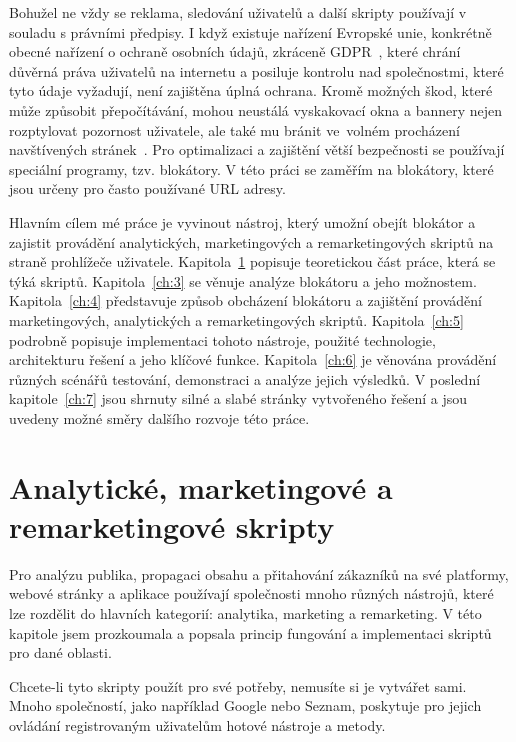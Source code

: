 Bohužel ne vždy se reklama, sledování uživatelů a další skripty používají v souladu s právními předpisy. I když existuje nařízení Evropské unie, konkrétně obecné nařízení o ochraně osobních údajů, zkráceně GDPR~\cite{GDPR}, které chrání důvěrná práva uživatelů na internetu a posiluje kontrolu nad společnostmi, které tyto údaje vyžadují, není zajištěna úplná ochrana. Kromě možných škod, které může způsobit přepočítávání, mohou neustálá vyskakovací okna a bannery nejen rozptylovat pozornost uživatele, ale také mu bránit ve~volném procházení navštívených stránek~\cite{adblock}. Pro optimalizaci a zajištění větší bezpečnosti se používají speciální programy, tzv. blokátory. V této práci se zaměřím na blokátory, které jsou určeny pro často používané URL adresy. 

Hlavním cílem mé práce je vyvinout nástroj, který umožní obejít blokátor a zajistit provádění analytických, marketingových a remarketingových skriptů na straně prohlížeče uživatele. Kapitola~\ref{ch:2} popisuje teoretickou část práce, která se týká skriptů. Kapitola~\ref{ch:3} se věnuje analýze blokátoru a jeho možnostem. Kapitola~\ref{ch:4} představuje způsob obcházení blokátoru a zajištění provádění marketingových, analytických a remarketingových skriptů. Kapitola~\ref{ch:5} podrobně popisuje implementaci tohoto nástroje, použité technologie, architekturu řešení a jeho klíčové funkce. Kapitola~\ref{ch:6} je věnována provádění různých scénářů testování, demonstraci a analýze jejich výsledků. V poslední kapitole~\ref{ch:7} jsou shrnuty silné a slabé stránky vytvořeného řešení a jsou uvedeny možné směry dalšího rozvoje této práce.



\chapter{Analytické, marketingové a remarketingové skripty}
\label{ch:2}
Pro analýzu publika, propagaci obsahu a přitahování zákazníků na své platformy, webové stránky a aplikace používají společnosti mnoho různých nástrojů, které lze rozdělit do hlavních kategorií: analytika, marketing a remarketing. V této kapitole jsem prozkoumala a popsala princip fungování a implementaci skriptů pro dané oblasti.

Chcete-li tyto skripty použít pro své potřeby, nemusíte si je vytvářet sami. Mnoho společností, jako například Google nebo Seznam, poskytuje pro jejich ovládání registrovaným uživatelům hotové nástroje a metody. 

\bigskip

